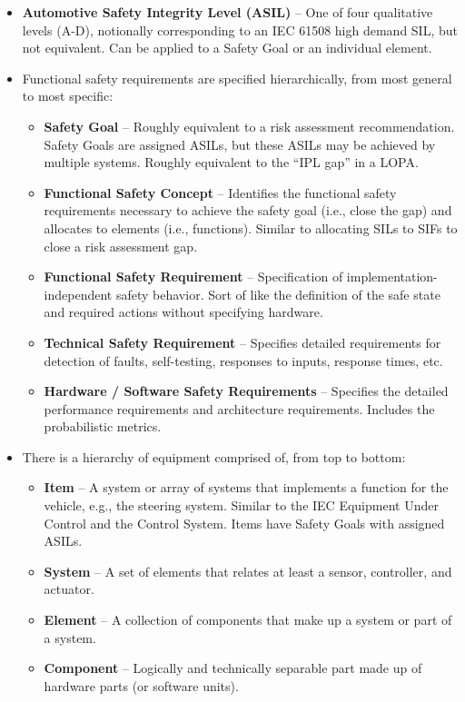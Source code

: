 \documentclass[./dissertation.tex]{subfiles}
\begin{document}
\begin{itemize}
\item \textbf{Automotive Safety Integrity Level (ASIL)} – One of four qualitative levels (A-D), notionally corresponding to an IEC 61508 high demand SIL, but not equivalent. Can be applied to a Safety Goal or an individual element.
\item Functional safety requirements are specified hierarchically, from most general to most specific:
\begin{itemize}
\item \textbf{Safety Goal} – Roughly equivalent to a risk assessment recommendation. Safety Goals are assigned ASILs, but these ASILs may be achieved by multiple systems. Roughly equivalent to the “IPL gap” in a LOPA.
\item \textbf{Functional Safety Concept} – Identifies the functional safety requirements necessary to achieve the safety goal (i.e., close the gap) and allocates to elements (i.e., functions). Similar to allocating SILs to SIFs to close a risk assessment gap.
\item \textbf{Functional Safety Requirement} – Specification of implementation-independent safety behavior. Sort of like the definition of the safe state and required actions without specifying hardware.
\item \textbf{Technical Safety Requirement} – Specifies detailed requirements for detection of faults, self-testing, responses to inputs, response times, etc.
\item \textbf{Hardware / Software Safety Requirements} – Specifies the detailed performance requirements and architecture requirements. Includes the probabilistic metrics.
\end{itemize}
\item There is a hierarchy of equipment comprised of, from top to bottom:
\begin{itemize}
\item \textbf{Item} – A system or array of systems that implements a function for the vehicle, e.g., the steering system. Similar to the IEC Equipment Under Control and the Control System. Items have Safety Goals with assigned ASILs.
\item \textbf{System} – A set of elements that relates at least a sensor, controller, and actuator.
\item \textbf{Element} – A collection of components that make up a system or part of a system.
\item \textbf{Component} – Logically and technically separable part made up of hardware parts (or software units).

\end{itemize}
\end{itemize}
\end{document}
